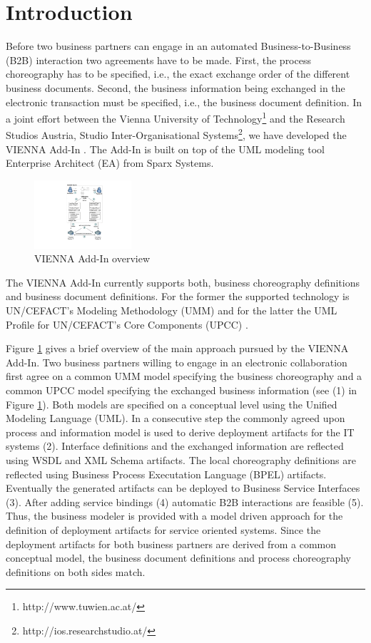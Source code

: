 \documentclass{acm_proc_article-sp}
\begin{document}
\section{Introduction}
Before two business partners can engage in an automated Business-to-Business (B2B) interaction two agreements have to be made. First, the process choreography has to be specified, i.e., the exact exchange order of the different business documents. Second, the business information being exchanged in the electronic transaction must be specified, i.e., the business document definition. In a joint effort between the Vienna University of Technology\footnote{http://www.tuwien.ac.at/} and the Research Studios Austria, Studio Inter-Organisational Systems\footnote{http://ios.researchstudio.at/}, we have developed the VIENNA Add-In \cite{man:VIENNAAddIn}. The Add-In is built on top of the UML modeling tool Enterprise Architect (EA) from Sparx Systems. %
\begin{figure}
 \centering
   \includegraphics[width=0.32\textwidth]{figures/addinoverview.pdf}
 \caption{VIENNA Add-In overview}
 \label{fig:viennaaddinoverview}
\end{figure}
The VIENNA Add-In currently supports both, business choreography definitions and business document definitions. For the former the supported technology is UN/CEFACT's Modeling Methodology (UMM) \cite{man:umm2} and for the latter the UML Profile for UN/CEFACT's Core Components (UPCC) \cite{man:upcc}. 

Figure \ref{fig:viennaaddinoverview} gives a brief overview of the main approach pursued by the VIENNA Add-In. Two business partners willing to engage in an electronic collaboration first agree on a common UMM model specifying the business choreography and a common UPCC model specifying the exchanged business information (see (1) in Figure \ref{fig:viennaaddinoverview}). Both models are specified on a conceptual level using the Unified Modeling Language (UML). In a consecutive step the commonly agreed upon process and information model is used to derive deployment artifacts for the IT systems (2). Interface definitions and the exchanged information are reflected using WSDL and XML Schema artifacts. The local choreography definitions are reflected using Business Process Executation Language (BPEL) artifacts. Eventually the generated artifacts can be deployed to Business Service Interfaces (3). After adding service bindings (4) automatic B2B interactions are feasible (5). Thus, the business modeler is provided with a model driven approach for the definition of deployment artifacts for service oriented systems. Since the deployment artifacts for both business partners are derived from a common conceptual model, the business document definitions and process choreography definitions on both sides match.
\end{document}
